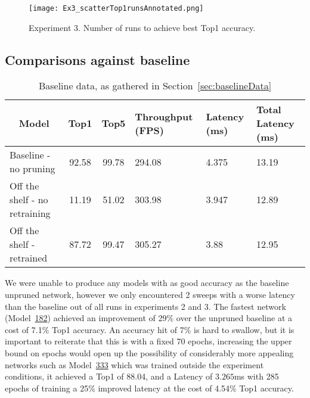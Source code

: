 \documentclass[../Dissertation.tex]{subfiles}
\begin{document}
\begin{figure}[H]
    \centering
    \texttt{[image: Ex3\_scatterTop1runsAnnotated.png]}
    \caption{Experiment 3. Number of runs to achieve best Top1 accuracy.}
    \label{fig:ex3Top1Rate}
\end{figure}

\subsection{Comparisons against baseline}\label{sec:vsBaseline}

\begin{table}[H]
    \begin{tabular}{@{}lccp{25mm}p{23mm}p{28mm}@{}}
    \toprule
    \multicolumn{1}{c}{\textbf{Model}} & \textbf{Top1} & \textbf{Top5} & \textbf{Throughput (FPS)} & \textbf{Latency (ms)} & \textbf{Total Latency (ms)} \\ \midrule
    Baseline - no pruning              & 92.58         & 99.78         & 294.08                    & 4.375                 & 13.19                       \\
    Off the shelf - no retraining      & 11.19         & 51.02         & 303.98                    & 3.947                 & 12.89                       \\
    Off the shelf - retrained          &  87.72        & 99.47         & 305.27                    & 3.88                  & 12.95                           \\ \bottomrule
    \end{tabular}
    \caption{Baseline data, as gathered in Section~\ref{sec:baselineData}}
\end{table}

We were unable to produce any models with as good accuracy as the baseline unpruned network, however we only encountered 2 sweeps with a worse latency than the baseline out of all runs in experiments 2 and 3.
The fastest network (Model~\hyperref[sec:unique-sweep-182]{182}) achieved an improvement of 29\% over the unpruned baseline at a cost of 7.1\% Top1 accuracy.
An accuracy hit of 7\% is hard to swallow, but it is important to reiterate that this is with a fixed 70 epochs, increasing the upper bound on epochs would open up the possibility of considerably more appealing networks such as Model~\hyperref[sec:fiery-sweep-333]{333} which was trained outside the experiment conditions, it achieved a Top1 of 88.04, and a Latency of $3.265$ms with 285 epochs of training a 25\% improved latency at the cost of 4.54\% Top1 accuracy.
\end{document}
